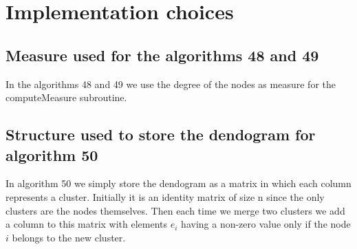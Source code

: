 \documentclass{eplDoc}
\begin{document}
\section{Implementation choices}

\subsection{Measure used for the algorithms 48 and 49}
In the algorithms 48 and 49 we use the degree of the nodes as measure for the computeMeasure subroutine. 

\subsection{Structure used to store the dendogram for algorithm 50}
In algorithm 50 we simply store the dendogram as a matrix in which each column represents a cluster. Initially it is an identity matrix of size n since the only clusters are the nodes themselves. Then each time we merge two clusters we add a column to this matrix with elements $e_i$ having a non-zero value only if the node $i$ belongs to the new cluster. 
\end{document}
